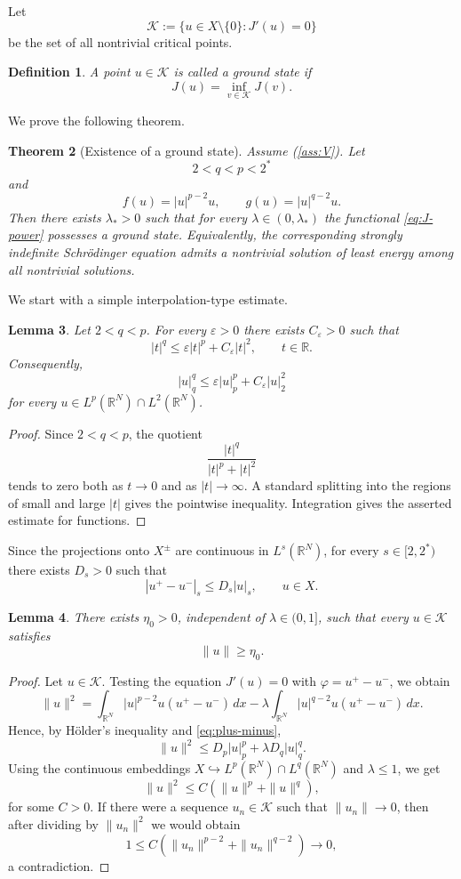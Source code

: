 \documentclass[10pt,a4paper]{amsart}
\numberwithin{equation}{section}
\newtheorem{theorem}{Theorem}[section]
\newtheorem{lemma}[theorem]{Lemma}
\newtheorem{definition}[theorem]{Definition}
\newcommand{\R}{\mathbb{R}}
\newcommand{\cK}{\mathcal{K}}
\newcommand{\eps}{\varepsilon}
\begin{document}
Let
\[
\cK:=\{u\in X\setminus\{0\}:J'(u)=0\}
\]
be the set of all nontrivial critical points.

\begin{definition}
A point $u\in\cK$ is called a ground state if
\[
J(u)=\inf_{v\in\cK}J(v).
\]
\end{definition}

We prove the following theorem.


\begin{theorem}[Existence of a ground state]\label{thm:ground-state}
Assume (\ref{ass:V}). Let
\[
2<q<p<2^*
\]
and
\[
f(u)=|u|^{p-2}u,\qquad g(u)=|u|^{q-2}u.
\]
Then there exists $\lambda_*>0$ such that for every
$\lambda\in(0,\lambda_*)$ the functional \eqref{eq:J-power} possesses a
ground state. Equivalently, the corresponding strongly indefinite
Schrödinger equation admits a nontrivial solution of least energy among
all nontrivial solutions.
\end{theorem}


We start with a simple interpolation-type estimate.

\begin{lemma}\label{lem:power-two}
Let $2<q<p$. For every $\eps>0$ there exists $C_\eps>0$ such that
\[
|t|^q\le \eps |t|^p+C_\eps |t|^2,\qquad t\in\R.
\]
Consequently,
\[
|u|_q^q\le \eps |u|_p^p+C_\eps |u|_2^2
\]
for every $u\in L^p(\R^N)\cap L^2(\R^N)$.
\end{lemma}

\begin{proof}
Since $2<q<p$, the quotient
\[
\frac{|t|^q}{|t|^p+|t|^2}
\]
tends to zero both as $t\to0$ and as $|t|\to\infty$. A standard splitting
into the regions of small and large $|t|$ gives the pointwise inequality.
Integration gives the asserted estimate for functions.
\end{proof}

Since the projections onto $X^\pm$ are continuous in $L^s(\R^N)$, for
every $s\in[2,2^*)$ there exists $D_s>0$ such that
\begin{equation}\label{eq:plus-minus}
|u^+-u^-|_s\le D_s |u|_s,\qquad u\in X.
\end{equation}

\begin{lemma}\label{lem:away-zero-critical}
There exists $\eta_0>0$, independent of $\lambda\in(0,1]$, such that every
$u\in\cK$ satisfies
\[
\|u\|\ge \eta_0.
\]
\end{lemma}

\begin{proof}
Let $u\in\cK$. Testing the equation $J'(u)=0$ with
$\varphi=u^+-u^-$, we obtain
\[
\|u\|^2
=
\int_{\R^N}|u|^{p-2}u(u^+-u^-)\,dx
-\lambda\int_{\R^N}|u|^{q-2}u(u^+-u^-)\,dx.
\]
Hence, by Hölder's inequality and \eqref{eq:plus-minus},
\[
\|u\|^2
\le D_p|u|_p^p+\lambda D_q|u|_q^q.
\]
Using the continuous embeddings $X\hookrightarrow L^p(\R^N)\cap
L^q(\R^N)$ and $\lambda\le1$, we get
\[
\|u\|^2\le C(\|u\|^p+\|u\|^q),
\]
for some $C>0$. If there were a sequence $u_n\in\cK$ such that $\|u_n\|\to0$, then after
dividing by $\|u_n\|^2$ we would obtain
\[
1\le C(\|u_n\|^{p-2}+\|u_n\|^{q-2})\to0,
\]
a contradiction.
\end{proof}
\end{document}
